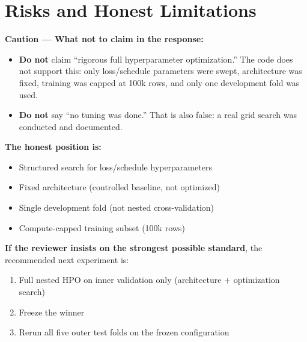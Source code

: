 \documentclass[11pt,a4paper]{article}
\begin{document}
\section{Risks and Honest Limitations}

\begin{cautionbox}
\textbf{Caution --- What not to claim in the response:}
\begin{itemize}
  \item \textbf{Do not} claim ``rigorous full hyperparameter optimization.''
        The code does not support this: only loss/schedule parameters were swept,
        architecture was fixed, training was capped at 100k rows, and only one
        development fold was used.
  \item \textbf{Do not} say ``no tuning was done.''
        That is also false: a real grid search was conducted and documented.
\end{itemize}

\medskip
\noindent\textbf{The honest position is:}
\begin{itemize}
  \item Structured search for loss/schedule hyperparameters
  \item Fixed architecture (controlled baseline, not optimized)
  \item Single development fold (not nested cross-validation)
  \item Compute-capped training subset (100k rows)
\end{itemize}

\medskip
\noindent\textbf{If the reviewer insists on the strongest possible standard},
the recommended next experiment is:
\begin{enumerate}
  \item Full nested HPO on inner validation only (architecture + optimization search)
  \item Freeze the winner
  \item Rerun all five outer test folds on the frozen configuration
\end{enumerate}
\end{cautionbox}
\end{document}
